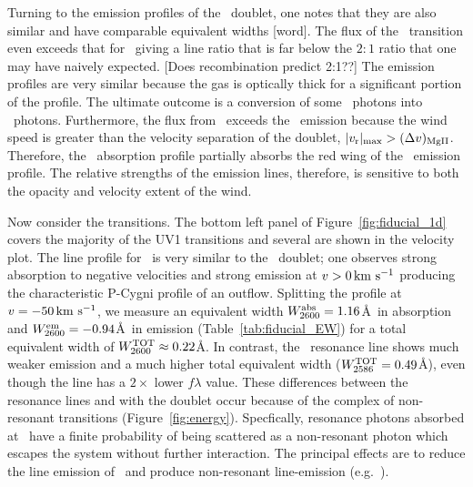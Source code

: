 \documentclass[12pt,preprint]{aastex}
\begin{document}
Turning to the emission profiles of the \mgiid\ doublet, one notes
that they are also similar and have comparable equivalent widths
[word].  The
flux of the \mgiib\ transition even exceeds that for \mgiia\ giving a
line ratio that is far below the $2:1$ ratio that one may have naively
expected. 
[Does recombination predict 2:1??]
The emission profiles are very similar because the gas is optically
thick for a significant portion of the profile. 
The ultimate outcome is a conversion of some \mgiia\ photons into
\mgiib\ photons.
Furthermore, the flux from \mgiib\ exceeds the
\mgiia\ emission because the wind speed is greater than the velocity separation
of the doublet, $|v_{\rm r}|_{\rm max} > (\Delta v)_{\rm MgII}$.
Therefore,
the \mgiib\ absorption profile partially absorbs the red wing of the
\mgiia\ emission profile.  The relative strengths of the emission
lines, therefore, is sensitive to both the opacity and velocity
extent of the wind.  

Now consider the  transitions.
The bottom left panel of Figure~\ref{fig:fiducial_1d} covers the
majority of the  UV1 transitions and several are
shown in the velocity plot.  The line
profile for \feiib\ is very similar to the \mgiid\ doublet;
one observes strong absorption to negative velocities and strong
emission at $v > 0 \, {\rm km~s^{-1}}$ producing the characteristic P-Cygni profile of
an outflow.  Splitting
the profile at $v = -50 \, {\rm km~s^{-1}}$, we measure an equivalent width
$W_{2600}^{\rm abs} = 1.16$\AA\ in absorption and $W_{2600}^{\rm em} =
-0.94$\AA\ in emission (Table~\ref{tab:fiducial_EW}) for a total
equivalent width of $W_{2600}^{\rm TOT} \approx 0.22$\AA.  
In contrast, the \feiia\ resonance line shows much weaker emission and
a much higher total equivalent width ($W_{2586}^{\rm TOT} = 0.49$\AA),
even though the line has a $2 \times$ lower $f\lambda$ value.
These differences between the  resonance lines and with the
 doublet occur because of the complex of non-resonant
 transitions (Figure~\ref{fig:energy}).  Specfically,
resonance photons absorbed at \feiid\ have a finite probability of
being scattered as a non-resonant photon which escapes the system
without further interaction.  The principal effects are to reduce the
line emission of \feiid\ and produce non-resonant line-emission (e.g.\
\feiic).
\end{document}
